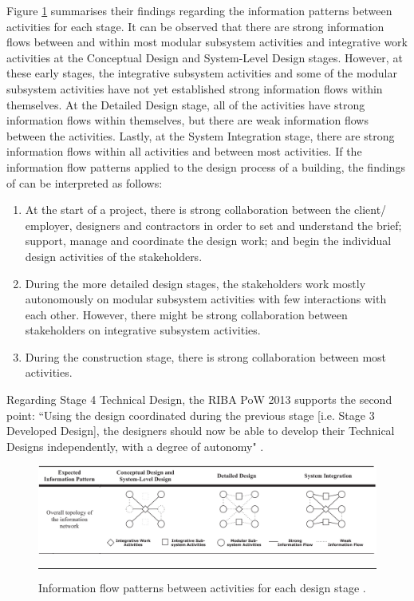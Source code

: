 Figure \ref{fig_Parraguez_patterns} summarises their findings regarding the information patterns between activities for each stage.
It can be observed that there are strong information flows between and within most modular subsystem activities and integrative work activities at the Conceptual Design and System-Level Design stages.
However, at these early stages, the integrative subsystem activities and some of the modular subsystem activities have not yet established strong information flows within themselves.
At the Detailed Design stage, all of the activities have strong information flows within themselves, but there are weak information flows between the activities.
Lastly, at the System Integration stage, there are strong information flows within all activities and between most activities.
If the information flow patterns applied to the design process of a building, the findings of \cite{Parraguez2015} can be interpreted as follows:
\begin{enumerate}
	\item At the start of a project, there is strong collaboration between the client/ employer, designers and contractors in order to set and understand the brief; support, manage and coordinate the design work; and begin the individual design activities of the stakeholders.
	\item During the more detailed design stages, the stakeholders work mostly autonomously on modular subsystem activities with few interactions with each other.
	However, there might be strong collaboration between stakeholders on integrative subsystem activities.
	\item During the construction stage, there is strong collaboration between most activities.
\end{enumerate}

Regarding Stage 4 Technical Design, the RIBA PoW 2013 supports the second point:
``Using the design coordinated during the previous stage [i.e. Stage 3 Developed Design], the designers should now be able to develop their Technical Designs independently, with a degree of autonomy"
\citep{RIBAPlan}.


\begin{figure}[tbp]
	\centering
	\includegraphics[width=\textwidth]{figures/Parraguez_patterns.png}
	\rule{\textwidth}{0.5pt} %
	\caption[Information flow patterns between activities for each design stage.]{Information flow patterns between activities for each design stage \citep[Table~III]{Parraguez2015}.}
	\label{fig_Parraguez_patterns}
\end{figure}


